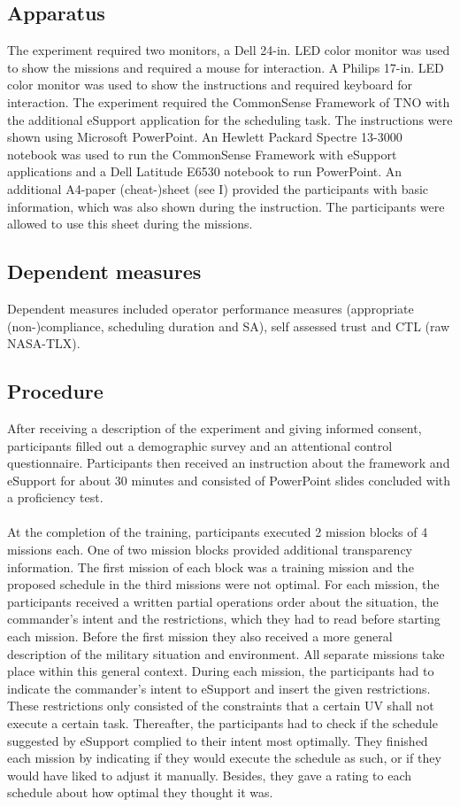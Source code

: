 \documentclass[twoside,twocolumn]{article}
\begin{document}
\subsection{Apparatus}
The experiment required two monitors, a Dell 24-in. LED color monitor was used to show the missions and required a mouse for interaction. A Philips 17-in. LED color monitor was used to show the instructions and required keyboard for interaction. The experiment required the CommonSense Framework of TNO with the additional eSupport application for the scheduling task. The instructions were shown using Microsoft PowerPoint. An Hewlett Packard Spectre 13-3000 notebook was used to run the CommonSense Framework with eSupport applications and a Dell Latitude E6530 notebook to run PowerPoint. An additional A4-paper (cheat-)sheet (see I) provided the participants with basic information, which was also shown during the instruction. The participants were allowed to use this sheet during the missions.

\subsection{Dependent measures}
Dependent measures included operator performance measures (appropriate (non-)compliance, scheduling duration and SA), self assessed trust and CTL (raw NASA-TLX). 

\subsection{Procedure}
After receiving a description of the experiment and giving informed consent, participants filled out a demographic survey and an attentional control questionnaire. Participants then received an instruction about the framework and eSupport for about 30 minutes and consisted of PowerPoint slides concluded with a proficiency test. 
\\\\
At the completion of the training, participants executed 2 mission blocks of 4 missions each. One of two mission blocks provided additional transparency information. The first mission of each block was a training mission and the proposed schedule in the third missions were not optimal. For each mission, the participants received a written partial operations order about the situation, the commander’s intent and the restrictions, which they had to read before starting each mission. Before the first mission they also received a more general description of the military situation and environment. All separate missions take place within this general context. During each mission, the participants had to indicate the commander’s intent to eSupport and insert the given restrictions. These restrictions only consisted of the constraints that a certain UV shall not execute a certain task. Thereafter, the participants had to check if the schedule suggested by eSupport complied to their intent most optimally. They finished each mission by indicating if they would execute the schedule as such, or if they would have liked to adjust it manually. Besides, they gave a rating to each schedule about how optimal they thought it was.
\end{document}
